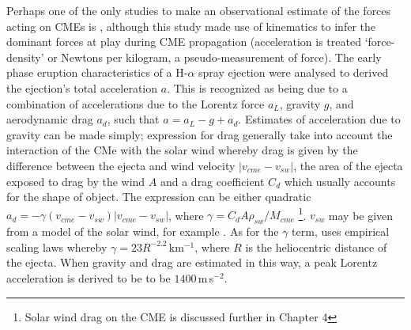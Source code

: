 
Perhaps one of the only studies to make an observational estimate of the forces acting on CMEs is \citet{vrs06}, although this study made use of kinematics to infer the dominant forces at play during CME propagation (acceleration is treated  \textquoteleft force-density' or Newtons per kilogram, a pseudo-measurement of force). The early phase eruption characteristics of a H-$\alpha$ spray ejection were analysed to derived the ejection's total acceleration $a$. This is recognized as being due to a combination of accelerations due to the Lorentz force $a_L$, gravity $g$, and aerodynamic drag $a_d$, such that $a = a_L -g +a_d$. Estimates of acceleration due to gravity can be made simply; expression for drag generally take into account the interaction of the CMe with the solar wind whereby drag is given by the difference between the ejecta and wind velocity $|v_{cme} - v_{sw}|$, the area of the ejecta exposed to drag by the wind $A$ and a drag coefficient $C_d$ which usually accounts for the shape of object. The expression can be either quadratic $a_d = - \gamma(v_{cme} - v_{sw})|v_{cme} - v_{sw}|$, where $\gamma = C_dA\rho_{sw}/M_{cme}$ \citep{cargill2004}\footnote{Solar wind drag on the CME is discussed further in Chapter 4}. $v_{sw}$ may be given from a model of the solar wind, for example \citet{sheeley1997}. As for the $\gamma$ term,\citet{vrs06} uses empirical scaling laws whereby $\gamma =  23R^{-2.2}$\,km$^{-1}$, where $R$ is the heliocentric distance of the ejecta. When gravity and drag are estimated in this way, a peak Lorentz acceleration is derived to be to be $1400$\,m\,s$^{-2}$. 
